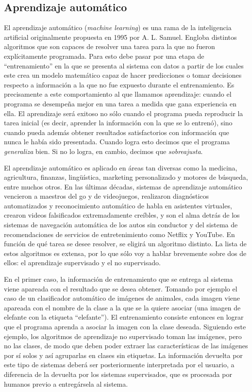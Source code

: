 \documentclass[12pt,twoside,a4paper]{article}
\begin{document}
\subsection{Aprendizaje automático}
El aprendizaje automático (\textit{machine learning}) es una rama de la inteligencia artificial originalmente propuesta en 1995 por A. L. Samuel\autocite{Samuel}. Engloba distintos algoritmos que son capaces de resolver una tarea para la que no fueron explícitamente programada. Para esto debe pasar por una etapa de ``entrenamiento'' en la que se presenta al sistema con datos a partir de los cuales este crea un modelo matemático capaz de hacer predicciones o tomar decisiones respecto a información a la que no fue expuesto durante el entrenamiento. Es precisamente a este comportamiento al que llamamos aprendizaje: cuando el programa se desempeña mejor en una tarea a medida que gana experiencia en ella. El aprendizaje será exitoso no sólo cuando el programa pueda reproducir la tarea inicial (es decir, aprender la información con la que se lo entrenó), sino cuando pueda además obtener resultados satisfactorios con información que nunca le había sido presentada. Cuando logra esto decimos que el programa \textit{generaliza} bien. Si no lo logra, en cambio, decimos que \textit{sobreajusta}.

El aprendizaje automático es aplicado en áreas tan diversas como la medicina, agricultura, finanzas, lingüística, marketing personalizado y motores de búsqueda, entre muchos otros. En las últimas décadas, sistemas de aprendizaje automático vencieron a maestros del go\autocite{Silver} y de videojuegos\autocite{peng}, realizaron diagnósticos automatizados y reconocimiento automático de habla en asistentes virtuales, crearon videos falsificados extremadamente creíbles\autocite{Schwartz}, y son el alma detrás de los sistemas de navegación automática de los autos sin conductor y del sistema de recomendaciones de servicios de entretenimiento como Netflix\autocite{Bell} y YouTube\autocite{Covington}. En función de qué tarea se desee resolver, se eligirá un algoritmo distinto. La lista de estos algoritmos es extensa, por lo que sólo voy a hablar brevemente sobre dos de ellos: el aprendizaje supervisado y el no supervisado.


En el primer caso, la información de entrenamiento que se entrega al sistema viene apareada con el resultado que se desea obtener. Tomando por ejemplo el caso de un clasificador automático de imágenes de animales, cada imagen viene apareada con el nombre de la clase a la que se la quiere asociar (una imagen de elefante con la etiqueta ``elefante''). El entrenamiento consiste entonces en lograr que el programa aprenda a asociar la imagen con la clase deseada. Siguiendo este ejemplo, los algoritmos de aprendizaje no supervisado toman las imágenes, pero no las clases, de modo que deben poder extraer las características de las imágenes por sí solos y así agruparlas en clases sin etiquetas. La información devuelta por este tipo de sistemas deberá ser posteriormente interpretada por el usuario, a diferencia de la devuelta por los sistemas supervisados, que es procesada por humanos previo a entregársela al sistema.
\end{document}
